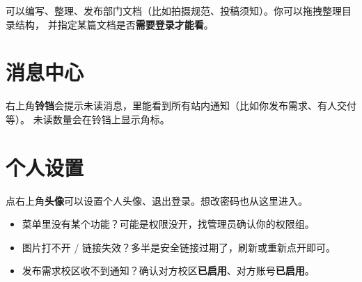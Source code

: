 \documentclass[cn,11pt,green]{elegantbook}
\begin{document}
可以编写、整理、发布部门文档（比如拍摄规范、投稿须知）。你可以拖拽整理目录结构，
并指定某篇文档是否\textbf{需要登录才能看}。

\section{消息中心}

右上角\textbf{铃铛}会提示未读消息，里能看到所有站内通知（比如你发布需求、有人交付等）。
未读数量会在铃铛上显示角标。

\section{个人设置}

点右上角\textbf{头像}可以设置个人头像、退出登录。想改密码也从这里进入。

\begin{tipbox}[遇到问题先看这几点]
  \begin{itemize}
    \item 菜单里没有某个功能？可能是权限没开，找管理员确认你的权限组。
    \item 图片打不开 / 链接失效？多半是安全链接过期了，刷新或重新点开即可。
    \item 发布需求校区收不到通知？确认对方校区\textbf{已启用}、对方账号\textbf{已启用}。
  \end{itemize}
\end{tipbox}
\end{document}
